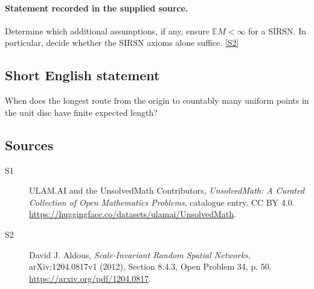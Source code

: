 \documentclass[11pt]{article}
\newcommand{\sref}[2]{\hyperlink{source:#1:#2}{[S#2]}}
\begin{document}
\paragraph{Statement recorded in the supplied source.}
Determine which additional assumptions, if any, ensure $\mathbb E M<\infty$ for a SIRSN. In particular, decide whether the SIRSN axioms alone suffice. \sref{statement}{2}
\subsection{Short English statement}
When does the longest route from the origin to countably many uniform points in the unit disc have finite expected length?
\subsection{Sources}
\begin{description}
\item[\hypertarget{source:statement:1}{S1}] ULAM.AI and the UnsolvedMath Contributors, \emph{UnsolvedMath: A Curated Collection of Open Mathematics Problems}, catalogue entry. CC BY 4.0. \url{https://huggingface.co/datasets/ulamai/UnsolvedMath}.
\item[\hypertarget{source:statement:2}{S2}] David J. Aldous, \emph{Scale-Invariant Random Spatial Networks}, arXiv:1204.0817v1 (2012), Section 8.4.3, Open Problem 34, p. 50. \url{https://arxiv.org/pdf/1204.0817}.
\end{description}
\label{end:statement}
\end{document}
